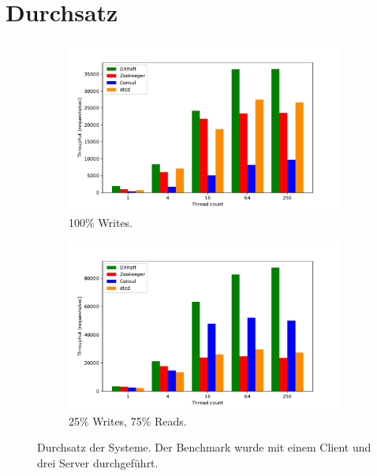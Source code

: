 \section{Durchsatz}
\label{throughput}

\begin{figure}[p]
	\centering
	\begin{subfigure}[t]{0.8\textwidth}
		\includegraphics[width=\textwidth]{img/throughput.pdf}
		\caption{100\% Writes.}
	\end{subfigure} 
	\begin{subfigure}[t]{0.8\textwidth}
		\includegraphics[width=\textwidth]{img/throughput2.pdf}
		\caption{25\% Writes, 75\% Reads.}
	\end{subfigure}
	\caption{Durchsatz der Systeme. Der Benchmark wurde mit einem Client und drei Server durchgeführt.}
	\label{fig:throughput}
\end{figure}

